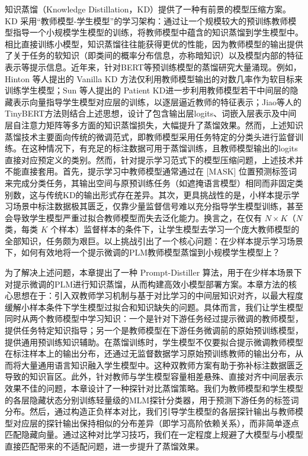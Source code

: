 \documentclass[../main.tex]{subfiles}
\begin{document}
知识蒸馏（Knowledge Distillation，KD）提供了一种有前景的模型压缩方案。KD 采用“教师模型-学生模型”的学习架构：通过让一个规模较大的预训练教师模型指导一个小规模学生模型的训练，将教师模型中蕴含的知识蒸馏到学生模型中。相比直接训练小模型，知识蒸馏往往能获得更优的性能，因为教师模型的输出提供了关于任务的软知识（即类间的概率分布信息，亦称暗知识）以及模型内部的特征表示等提示信息。近年来，针对BERT等预训练模型的蒸馏研究大量涌现。例如， Hinton 等人提出的 Vanilla KD 方法\cite{distillingknowledgeneural_hinton_2015}仅利用教师模型输出的对数几率作为软目标来训练学生模型；Sun 等人提出的 Patient KD\cite{patientknowledgedistillation_sun_2019}进一步利用教师模型若干中间层的隐藏表示向量指导学生模型对应层的训练，以逐层逼近教师的特征表示；Jiao等人的TinyBERT方法\cite{tinybertdistillingbert_jiao_2020}则结合上述思想，设计了包含输出层logits、词嵌入层表示及中间层自注意力矩阵等多方面的知识蒸馏损失，大幅提升了蒸馏效果。然而，上述知识蒸馏技术主要面向传统的微调范式，即教师模型采用任务特定的分类头进行监督训练。在这种情况下，有充足的标注数据可用于蒸馏训练，且教师模型输出的logits直接对应预定义的类别。然而，针对提示学习范式下的模型压缩问题，上述技术并不能直接套用。首先，提示学习中教师模型通常通过在 [MASK] 位置预测标签词来完成分类任务，其输出空间与原预训练任务（如遮掩语言模型）相同而非固定类别数，这与传统KD的输出形式存在差异。其次，更具挑战性的是，小样本提示学习场景中标注数据极其匮乏，仅靠少量监督信号难以充分指导学生模型训练，甚至会导致学生模型严重过拟合教师模型而失去泛化能力。换言之，在仅有 $N\times K$（$N$ 类，每类 $K$ 个样本）监督样本的条件下，让学生模型去学习一个庞大教师模型的全部知识，任务颇为艰巨。以上挑战引出了一个核心问题：在少样本提示学习场景下，如何有效地将一个提示微调的PLM教师模型蒸馏到小规模学生模型上？

为了解决上述问题，本章提出了一种 Prompt-Distiller 算法，用于在少样本场景下对提示微调的PLM进行知识蒸馏，从而构建高效小模型部署方案。本章方法的核心思想在于：引入双教师学习机制与基于对比学习的中间层知识对齐，以最大程度缓解小样本条件下学生模型过拟合和知识缺失的问题。具体而言，我们让学生模型同时从两个教师模型中学习知识：一个是针对下游任务经过提示微调的教师模型，提供任务特定知识指导；另一个是教师模型在下游任务微调前的原始预训练模型，提供通用预训练知识辅助。在蒸馏训练时，学生模型不仅要拟合提示微调教师模型在标注样本上的输出分布，还通过无监督数据学习原始预训练教师的输出分布，从而将大量通用语言知识融入学生模型中。这种双教师方案有助于弥补标注数据匮乏导致的知识盲区。此外，针对教师与学生模型容量相差悬殊、直接对齐中间层表示效果不佳的问题，本章设计了一种探针对比蒸馏策略。我们为教师模型和学生模型的各层隐藏状态分别训练轻量级的MLM探针分类器，用于预测下游任务的标签词分布。然后，通过构造正负样本对比，我们引导学生模型的各层探针输出与教师模型对应层的探针输出保持相似的分布差异（即学习高阶依赖关系），而非简单逐点匹配隐藏向量。通过这种对比学习技巧，我们在一定程度上规避了大模型与小模型直接匹配带来的不适配问题，进一步提升了蒸馏效果。
\end{document}
